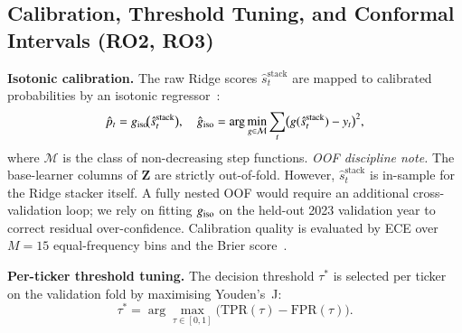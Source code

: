 \subsection{Calibration, Threshold Tuning, and Conformal Intervals (RO2, RO3)}
\label{subsec:calib}

\textbf{Isotonic calibration.} The raw Ridge scores $\hat{s}_t^{\text{stack}}$
are mapped to calibrated probabilities by an isotonic
regressor~\cite{zadrozny2002transforming}:
\begin{equation}
\hat{p}_t = g_{\rm iso}\!\bigl(\hat{s}_t^{\text{stack}}\bigr),\quad
\hat{g}_{\rm iso} = \arg\min_{g \in \mathcal{M}}
  \sum_t \bigl(g(\hat{s}_t^{\text{stack}})-y_t\bigr)^2,
\label{eq:isotonic}
\end{equation}
where $\mathcal{M}$ is the class of non-decreasing step functions.
\textit{OOF discipline note.} The base-learner columns of $\mathbf{Z}$ are
strictly out-of-fold. However, $\hat{s}_t^{\text{stack}}$ is in-sample for
the Ridge stacker itself. A fully nested OOF would require an additional
cross-validation loop; we rely on fitting $g_{\rm iso}$ on the held-out 2023
validation year to correct residual over-confidence. Calibration quality is
evaluated by ECE over $M=15$ equal-frequency bins and the Brier
score~\cite{brier1950verification}.

\textbf{Per-ticker threshold tuning.} The decision threshold $\tau^*$ is
selected per ticker on the validation fold by maximising Youden's~J:
\begin{equation}
\tau^* = \arg\max_{\tau \in [0,1]}\!\bigl(\mathrm{TPR}(\tau)-\mathrm{FPR}(\tau)\bigr).
\label{eq:youden}
\end{equation}


